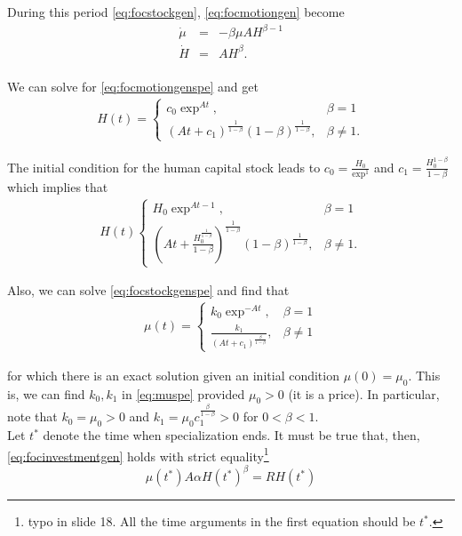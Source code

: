 \noindent During this period \eqref{eq:focstockgen}, \eqref{eq:focmotiongen} become 
\begin{eqnarray}
\dot{\mu} &=& - \beta \mu A H^{\beta - 1} \label{eq:focstockgenspe} \\
\dot{H}  &=& A H^{\beta}. \label{eq:focmotiongenspe}\\
\end{eqnarray}

\indent We can solve for \eqref{eq:focmotiongenspe} and get
\begin{eqnarray}
H(t) =
\begin{cases}
c_{0} \exp^{At}, & \beta = 1 \\ 
\left( At + c_{1} \right)^{\frac{1}{1 - \beta}} (1 - \beta)^{\frac{1}{1 - \beta}}, & \beta \neq 1.

\end{cases}
\end{eqnarray}

\noindent The initial condition for the human capital stock leads to $c_{0} = \frac{H_{0}}{\exp^{1}} $ and $c_{1} = \frac{H_{0}^{1 - \beta}}{1-\beta}$ which implies that
\begin{eqnarray}
H(t)
\begin{cases}
H_{0} \exp^{At - 1}, & \beta = 1 \\
\left( At + \frac{H_{0}^{\frac{1}{1-\beta}}}{1-\beta} \right)^{\frac{1}{1 - \beta}} \left( 1 - \beta \right)^{\frac{1}{1-\beta}}, & \beta \neq 1. \label{eq:humanspe}
\end{cases}
\end{eqnarray}

\indent Also, we can solve \eqref{eq:focstockgenspe} and find that
\begin{eqnarray}
\mu(t) =
\begin{cases}
k_{0} \exp^{-At}, & \beta = 1 \\
\frac{k_{1}}{(At + c_{1})^{\frac{\beta}{1-\beta}}}, & \beta \neq 1 \label{eq:muspe}
\end{cases}
\end{eqnarray}

\noindent for which there is an exact solution given an initial condition $\mu(0) = \mu_{0}$. This is, we can find $k_{0}, k_{1}$ in \eqref{eq:muspe} provided $\mu_{0} > 0$ (it is a price). In particular, note that $k_{0} = \mu_{0} > 0$ and $k_{1} = \mu_{0} c_{1}^{\frac{\beta}{1-\beta}} > 0$ for $0<\beta<1$.\\
\indent Let $t^*$ denote the time when specialization ends. It must be true that, then, \eqref{eq:focinvestmentgen} holds with strict equality\footnote{typo in slide 18. All the time arguments in the first equation should be $t^*$.}
\begin{equation}
\mu(t^*) A \alpha H(t^*)^{\beta} = RH(t^*)
\end{equation}


